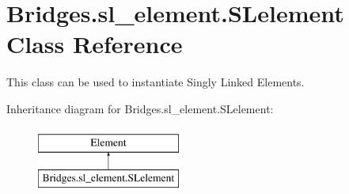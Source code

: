 \hypertarget{class_bridges_1_1sl__element_1_1_s_lelement}{}\section{Bridges.\+sl\+\_\+element.\+S\+Lelement Class Reference}
\label{class_bridges_1_1sl__element_1_1_s_lelement}


This class can be used to instantiate Singly Linked Elements.  


Inheritance diagram for Bridges.\+sl\+\_\+element.\+S\+Lelement\+:\begin{figure}[H]
\begin{center}
\leavevmode
\includegraphics[height=2.000000cm]{class_bridges_1_1sl__element_1_1_s_lelement}
\end{center}
\end{figure}
